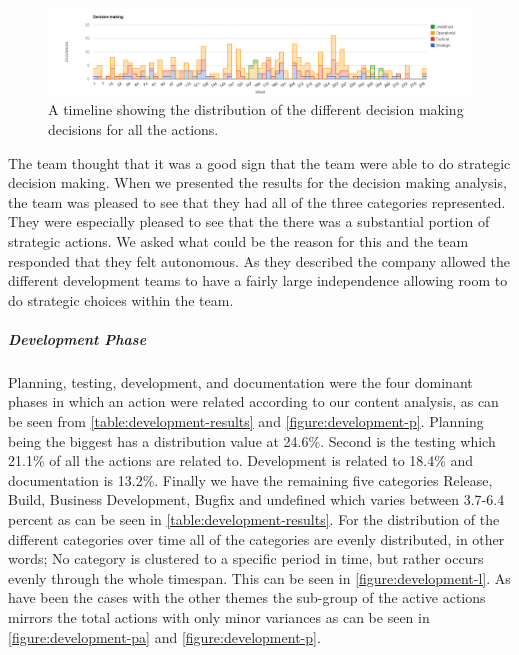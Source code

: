 \begin{figure}
	\centering
	\includegraphics[width=\textwidth, keepaspectratio]{figures/decision-l.png}
	\caption{A timeline showing the distribution of the different decision making decisions for all the actions.}
	\label{figure:decision-l}
\end{figure}

The team thought that it was a good sign that the team were able to do strategic decision making. When we presented the results for the decision making analysis, the team was pleased to see that they had all of the three categories represented. They were especially pleased to see that the there was a substantial portion of strategic actions. We asked what could be the reason for this and the team responded that they felt autonomous. As they described the company allowed the different development teams to have a fairly large independence allowing room to do strategic choices within the team. 

\subparagraph{Development Phase}
\label{section:development-phase}
Planning, testing, development, and documentation were the four dominant phases in which an action were related according to our content analysis, as can be seen from \autoref{table:development-results} and \autoref{figure:development-p}. Planning being the biggest has a distribution value at 24.6\%. Second is the testing which 21.1\% of all the actions are related to. Development is related to 18.4\% and documentation is 13.2\%. Finally we have the remaining five categories Release, Build, Business Development, Bugfix and undefined which varies between 3.7-6.4 percent as can be seen in \autoref{table:development-results}. 
For the distribution of the different categories over time all of the categories are evenly distributed, in other words; No category is clustered to a specific period in time, but rather occurs evenly through the whole timespan. This can be seen in \autoref{figure:development-l}.
As have been the cases with the other themes the sub-group of the active actions mirrors the total actions with only minor variances as can be seen in \autoref{figure:development-pa} and \autoref{figure:development-p}.

